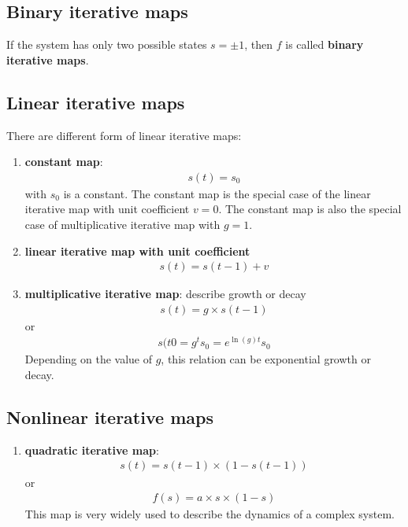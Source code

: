 \subsection{Binary iterative maps}
\label{sec:binary-iter-maps}

If the system has only two possible states $s=\pm 1$, then $f$ is
called {\bf binary iterative maps}.

\subsection{Linear iterative maps}
\label{sec:line-iter-maps}

There are different form of linear iterative maps:
\begin{enumerate}
\item {\bf constant map}: 
  \begin{eqnarray}
    \label{eq:253}
    s(t) = s_0
  \end{eqnarray}
  with $s_0$ is a constant. The constant map is the special case of
  the linear iterative map with unit coefficient $v=0$. The constant
  map is also the special case of multiplicative iterative map with $g=1$.

\item {\bf linear iterative map with unit coefficient}
  \begin{eqnarray}
    \label{eq:253}
    s(t) = s(t-1) + v 
  \end{eqnarray}

\item {\bf multiplicative iterative map}: describe growth or decay
  \begin{eqnarray}
    \label{eq:253}
    s(t) = g\times s(t-1)
  \end{eqnarray}
or
\begin{eqnarray*}
  s(t0 = g^ts_0= e^{\ln(g)t} s_0
\end{eqnarray*}
Depending on the value of $g$, this relation can be exponential growth
or decay. 

\end{enumerate}

\subsection{Nonlinear iterative maps}
\label{sec:nonl-iter-maps}

\begin{enumerate}
\item {\bf quadratic iterative map}: 
  \begin{eqnarray}
    \label{eq:253}
    s(t) = s(t-1)\times (1-s(t-1))
  \end{eqnarray}
or
\begin{eqnarray}
  \label{eq:253}
  f(s) = a\times s\times (1-s)
\end{eqnarray}
This map is very widely used to describe the dynamics of a complex system.
\end{enumerate}

